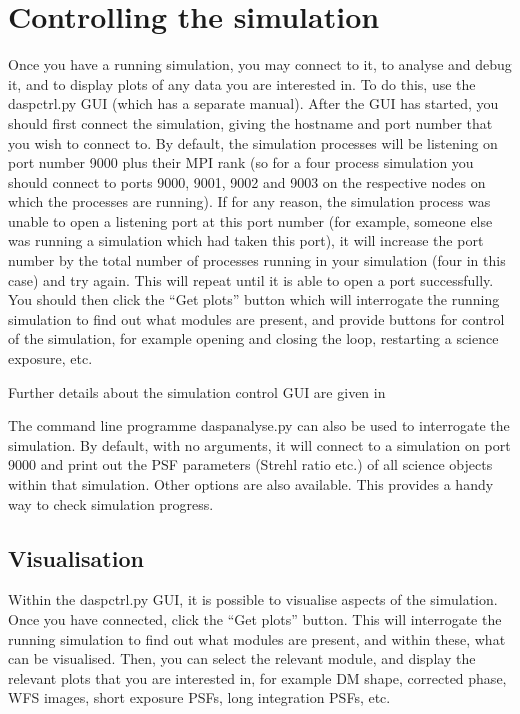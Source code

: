 \documentclass{article}
\begin{document}
\section{Controlling the simulation}
Once you have a running simulation, you may connect to it, to analyse
and debug it, and to display plots of any data you are interested in.
To do this, use the daspctrl.py GUI (which has a separate manual).  After the GUI has started, you
should first connect the simulation,
giving the hostname and port number that you wish to connect to.  By
default, the simulation processes will be listening on port number
9000 plus their MPI rank (so for a four process simulation you should
connect to ports 9000, 9001, 9002 and 9003 on the respective nodes on
which the processes are running).  If for any reason, the simulation
process was unable to open a listening port at this port number (for
example, someone else was running a simulation which had taken this
port), it will increase the port number by the total number of
processes running in your simulation (four in this case) and try
again.  This will repeat until it is able to open a port
successfully.  You should then click the ``Get plots'' button which
will interrogate the running simulation to find out what modules are
present, and provide buttons for control of the simulation, for
example opening and closing the loop, restarting a science exposure,
etc.  

Further details about the simulation control GUI are given in
\citet{simctrlgui}

The command line programme daspanalyse.py can also be used to
interrogate the simulation.  By default, with no arguments, it will
connect to a simulation on port 9000 and print out the PSF parameters
(Strehl ratio etc.) of all science objects within that simulation.
Other options are also available.  This provides a handy way to check
simulation progress.



\subsection{Visualisation}
Within the daspctrl.py GUI, it is possible to visualise aspects of the
simulation.  Once you have connected, click the ``Get plots'' button.
This will interrogate the running simulation to find out what modules
are present, and within these, what can be visualised.  Then, you can
select the relevant module, and display the relevant plots that you
are interested in, for example DM shape, corrected phase, WFS images,
short exposure PSFs, long integration PSFs, etc.
\end{document}
